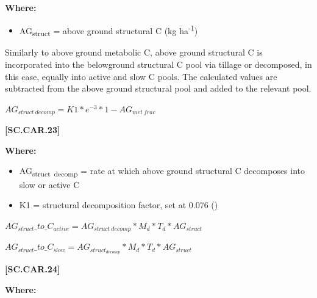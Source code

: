         \textbf{Where:}

        \begin{itemize}
            \item AG\textsubscript{struct} = above ground structural C (kg ha\textsuperscript{-1})
        \end{itemize}
        \vspace{0.5cm}

Similarly to above ground metabolic C, above ground structural C is incorporated into the belowground structural C pool via tillage or decomposed, in this case, equally into active and slow C pools. The calculated values are subtracted from the above ground structural pool and added to the relevant pool.
        \vspace{0.5cm}

    \begin{center}
\(AG_{struct\ decomp}=K1 * e^{-3} * 1-AG_{met\ frac}	\)
    \end{center}
        \vspace{0.5cm} 
    
            {\raggedleft \textbf{[SC.CAR.23]}\par}
            \vspace{0.5cm}

        \textbf{Where:}

        \begin{itemize}
            \item AG\textsubscript{struct\ decomp} = rate at which above ground structural C decomposes into slow or active C
            \item K1 = structural decomposition factor, set at 0.076 (\cite{parton1987analysis})
        \end{itemize}
        \vspace{0.5cm}

    \begin{center}
\(AG_{struct}\_to\_C_{active}=AG_{struct\ decomp} * M_d * T_d * AG_{struct}\)
\vspace{0.1cm}

\(AG_{struct}\_to\_C_{slow}=AG_{struct_{decomp}} * M_d * T_d * AG_{struct}\)
    \end{center}
        \vspace{0.5cm} 
    
            {\raggedleft \textbf{[SC.CAR.24]}\par}
            \vspace{0.5cm}

        \textbf{Where:}
            

